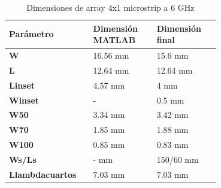 \begin{table}[H]
  
   \label{tab:array4x12}
   \small %
   \centering %
   \begin{tabular}{m{0.2\linewidth}m{0.25\linewidth}m{0.25\linewidth}} %
   \toprule[\heavyrulewidth]\toprule[\heavyrulewidth]
   \textbf{Parámetro} & \textbf{Dimensión MATLAB} & \textbf{Dimensión final} \\ 
   \midrule
   \textbf{W} & 16.56 mm & 15.6 mm \\
   \textbf{L} & 12.64 mm & 12.64 mm\\
   \textbf{Linset} & 4.57 mm & 4 mm\\
   \textbf{Winset} & - & 0.5 mm\\
   \textbf{W50} & 3.34 mm & 3.42 mm\\
   \textbf{W70} & 1.85 mm & 1.88 mm\\
   \textbf{W100} & 0.85 mm & 0.83 mm\\
   \textbf{Ws/Ls} & - mm & 150/60 mm\\
   \textbf{Llambdacuartos} & 7.03 mm & 7.03 mm\\
   \bottomrule[\heavyrulewidth] 
   \end{tabular}
   \caption{Dimensiones de array 4x1 microstrip a 6 GHz} 
\end{table}






